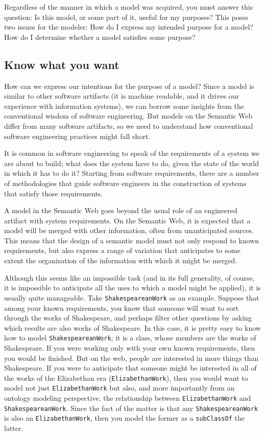 Regardless of the manner in which a model was acquired, you must answer
this question: Is this model, or some part of it, useful for my
purposes? This poses two issues for the modeler: How do I express my
intended purpose for a model? How do I determine whether a model
satisfies some purpose?

\subsection{Know what you want}

How can we express our intentions for the purpose of a model?  Since a model
is similar to other software artifacts (it is machine readable, and it drives our 
experience with information systems), we can borrow some insights from the conventional
wisdom of software engineering.  But models on the Semantic Web differ from many
software artifacts, so we need to understand how conventional software 
engineering practices
might fall short.

It is common in software engineering to speak of the 
requirements of a system we are about to build; what does the system have to 
do, given the state of the world in which it has to do it?  Starting from 
software requirements, there are a number of methodologies that guide software 
engineers in the construction of systems that satisfy those requirements. 

A model in the
Semantic Web goes beyond the usual role of an engineered artifact with
system requirements. On the Semantic Web, it is expected that a model
will be merged with other information, often from unanticipated sources.
This means that the design of a semantic model must not only respond to
known requirements, but also
express a range of variation that anticipates to some extent the
organization of the information with which it might be merged.

Although this seems like an impossible task (and in its full generality,
of course, it is
impossible to anticipate all the uses to which a model might be
applied), it is usually quite manageable. Take \texttt{ShakespeareanWork}
as an example.  Suppose that among your known requirements, you know that 
someone will want to sort through the works of Shakespeare, and perhaps
filter other questions by asking which results are also works of Shakespeare. 
In this case, it is pretty easy to know how to model \texttt{ShakespeareanWork}; it 
is a class, whose members are the works of Shakespeare. 
If you were working only with your own known requirements, then you would be
finished.  But on the web, people are interested in more things than Shakespeare.
If you were to anticipate that someone might be interested in all of the works
of the Elizabethan era (\texttt{ElizabethanWork}), then you would want to model not just
\texttt{ElizabethanWork} but also, and more importantly from an ontology modeling 
perspective, the relationship between \texttt{ElizabethanWork} and \texttt{ShakespeareanWork}.  Since the fact of the matter is that any \texttt{ShakespeareanWork} is also an \texttt{ElizabethanWork}, then you model the former as a \texttt{subClassOf} the latter. 

